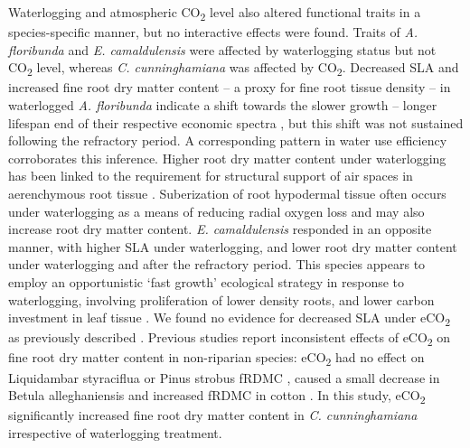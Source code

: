 \documentclass[openright,12pt,a4paper]{memoir}
\begin{document}
Waterlogging and atmospheric CO\textsubscript{2} level also altered functional traits in a species-specific manner, but no interactive effects were found. Traits of \textit{A. floribunda} and \textit{E. camaldulensis} were affected by waterlogging status but not CO\textsubscript{2} level, whereas \textit{C. cunninghamiana} was affected by CO\textsubscript{2}. Decreased SLA and increased fine root dry matter content – a proxy for fine root tissue density \citep{Birouste2013} – in waterlogged \textit{A. floribunda} indicate a shift towards the slower growth – longer lifespan  end of their respective economic spectra \citep{Reich2014}, but this shift was not sustained following the refractory period. A corresponding pattern in water use efficiency corroborates this inference. Higher root dry matter content under waterlogging has been linked to the requirement for structural support of air spaces in aerenchymous root tissue \citep{Ryser2011}. Suberization of root hypodermal tissue often occurs under waterlogging as a means of reducing radial oxygen loss \citep{Visser2000, DeSimone2002} and may also increase root dry matter content. \textit{E. camaldulensis} responded in an opposite manner, with higher SLA under waterlogging, and lower root dry matter content under waterlogging and after the refractory period. This species appears to employ an opportunistic ‘fast growth’ ecological strategy in response to waterlogging, involving proliferation of lower density roots, and lower carbon investment in leaf tissue \citep{Wright2004, Reich2014}. We found no evidence for decreased SLA under eCO\textsubscript{2} as previously described \citep{Poorter2003a}. Previous studies report inconsistent effects of eCO\textsubscript{2} on fine root dry matter content in non-riparian species: eCO\textsubscript{2} had no effect on Liquidambar styraciflua or Pinus strobus fRDMC \citep{Bauer2001,Iversen2008}, caused a small decrease in Betula alleghaniensis \citep{Bauer2001} and increased fRDMC in cotton \citep{Prior1994}. In this study, eCO\textsubscript{2} significantly increased fine root dry matter content in \textit{C. cunninghamiana} irrespective of waterlogging treatment.
\end{document}

